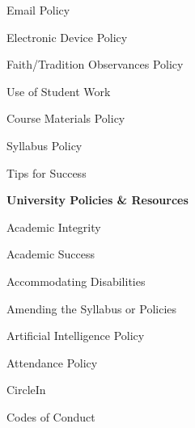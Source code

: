 \documentclass[11pt,letterpaper]{article}
\begin{document}
\begin{minipage}[t]{0.45\textwidth}
\hspace{0.3cm} Email Policy \dotfill \pageref{email_policy} \par 
\hspace{0.3cm} Electronic Device Policy \dotfill \pageref{electronic} \par
\hspace{0.3cm} Faith/Tradition Observances Policy \dotfill \pageref{faith} \par
\hspace{0.3cm} Use of Student Work \dotfill \pageref{std_work} \par
\end{minipage} \hfill \begin{minipage}[t]{0.45\textwidth} \par %
\hspace{0.3cm} Course Materials Policy \dotfill \pageref{copyright} \par
\hspace{0.3cm} Syllabus Policy \dotfill \pageref{syllabus} \par
\hspace{0.3cm} Tips for Success \dotfill \pageref{tips} \par
{\bfseries\color{scred} University Policies \& Resources} \dotfill \pageref{univ_policies} \par
\hspace{0.3cm} Academic Integrity \dotfill \pageref{univ_academicintegrity} \par
\hspace{0.3cm} Academic Success \dotfill \pageref{univ_success} \par
\hspace{0.3cm} Accommodating Disabilities \dotfill \pageref{univ_ada} \par
\hspace{0.3cm} Amending the Syllabus or Policies \dotfill \pageref{univ_amending} \par
\hspace{0.3cm} Artificial Intelligence Policy \dotfill \pageref{univ_artintel} \par
\hspace{0.3cm} Attendance Policy \dotfill \pageref{univ_attendance} \par
\hspace{0.3cm} CircleIn \dotfill \pageref{circlein} \par
\hspace{0.3cm} Codes of Conduct \dotfill \pageref{univ_conduct} \par

\end{minipage}
\end{document}

